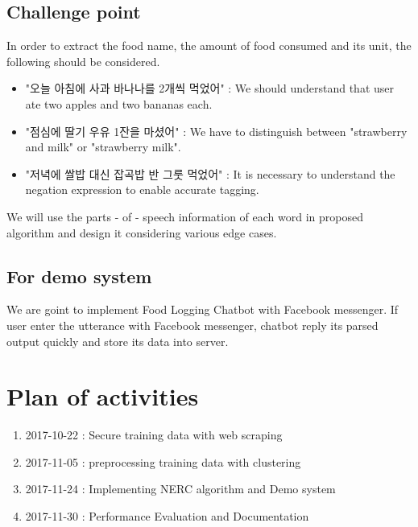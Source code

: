 \documentclass[11pt,a4paper]{article}
\begin{document}
\subsection{Challenge point}
\label{ssec:layout}

In order to extract the food name, the amount of food consumed and its unit, the following should be considered.

\begin{itemize}
\item "오늘 아침에 사과 바나나를 2개씩 먹었어" : We should understand that user ate two apples and two bananas each.
\item "점심에 딸기 우유 1잔을 마셨어" : We have to distinguish between "strawberry and milk" or "strawberry milk".
\item "저녁에 쌀밥 대신 잡곡밥 반 그룻 먹었어" : It is necessary to understand the negation expression to enable accurate tagging.
\end{itemize}
We will use the parts - of - speech information of each word in proposed algorithm and design it considering various edge cases.


\subsection{For demo system}

We are goint to implement Food Logging Chatbot with Facebook messenger. If user enter the utterance with Facebook messenger, chatbot reply its parsed output quickly and store its data into server.


\section{Plan of activities}
\begin{enumerate}
  \item 2017-10-22 : Secure training data with web scraping
  \item 2017-11-05 : preprocessing training data with clustering
  \item 2017-11-24 : Implementing NERC algorithm and Demo system
  \item 2017-11-30 : Performance Evaluation and Documentation
\end{enumerate}
\end{document}
